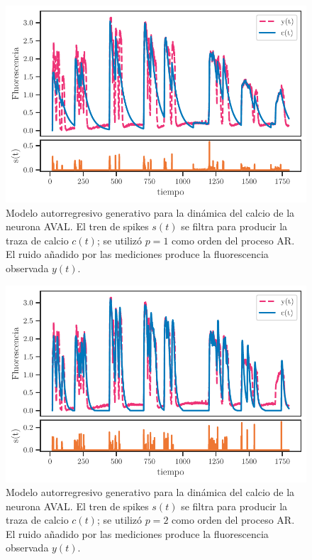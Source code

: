  
 
 
   \begin{figure}[h!]
 	\centering{}\includegraphics[width=\imsize]{oasis_p1.pdf}
 	\caption[Modelo autorregresivo generativo para la dinámica del calcio de la neurona AVAL.]{Modelo autorregresivo generativo para la dinámica del calcio de la neurona AVAL. El tren de spikes $s(t)$ se filtra para producir la traza de calcio $c(t)$; se utilizó $p = 1$ como orden del proceso AR. El ruido añadido por las mediciones produce la fluorescencia observada $y(t)$. }\label{f:oasis_p1}  
 \end{figure}
 
    \begin{figure}[h!]
 	\centering{}\includegraphics[width=\imsize]{oasis_p2.pdf}
 	\caption[Modelo autorregresivo generativo para la dinámica del calcio de la neurona AVAL.]{Modelo autorregresivo generativo para la dinámica del calcio de la neurona AVAL. El tren de spikes $s(t)$ se filtra para producir la traza de calcio $c(t)$; se utilizó $p = 2$ como orden del proceso AR. El ruido añadido por las mediciones produce la fluorescencia observada $y(t)$. }\label{f:oasis_p2}  
 \end{figure}
   
